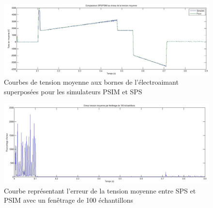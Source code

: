 \documentclass[11pt,letterpaper,final]{report}
\begin{document}
\begin{figure}[h!]
\centering
\includegraphics[scale=0.4]{fig/tmoyPSIM_sim.jpg}
\caption{Courbes de tension moyenne aux bornes de l'électroaimant superposées pour les simulateurs PSIM et SPS}
\label{moyt}
\end{figure}
\begin{figure}[h!]
\centering
\includegraphics[scale=0.4]{fig/erre_ten_fen.jpg}
\caption{Courbe représentant l'erreur de la tension moyenne entre SPS et PSIM avec un fenêtrage de 100 échantillons}
\label{err_ten}
\end{figure}
\end{document}

